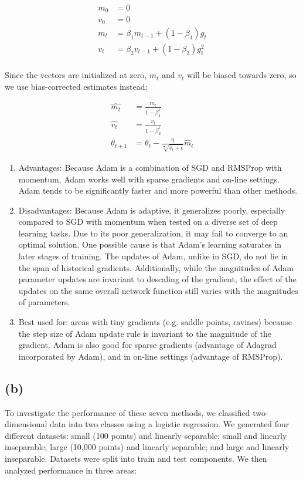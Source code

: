 \documentclass[twoside,11pt]{homework}
\begin{document}
\begin{align*}
	m_0 &= 0\\
	v_0 &= 0\\
	m_t &= \beta_1 m_{t-1}+(1-\beta_1)g_t\\
	v_t &= \beta_2 v_{t-1}+(1-\beta_2)g^2_t\\
\end{align*}

Since the vectors are initialized at zero, $m_t$ and $v_t$ will be biased towards zero, so we use bias-corrected estimates instead:

\begin{align*}
	\hat{m_t} &= \frac{m_t}{1-\beta^t_1}\\
	\hat{v_t} &= \frac{v_t}{1-\beta^t_2}\\
	\theta_{t+1} &= \theta_t - \frac{\eta}{\sqrt[•]{\hat{v}_t+\epsilon}}\hat{m}_t
\end{align*}

\begin{enumerate}
	\item Advantages: Because Adam is a combination of SGD and RMSProp with momentum, Adam works well with sparse gradients and on-line settings. Adam tends to be significantly faster and more powerful than other methods.
	\item Disadvantages: Because Adam is adaptive, it generalizes poorly, especially compared to SGD with momentum when tested on a diverse set of deep learning tasks. Due to its poor generalization, it may fail to converge to an optimal solution. One possible cause is that Adam's learning saturates in later stages of training. The updates of Adam, unlike in SGD, do not lie in the span of historical gradients. Additionally, while the magnitudes of Adam parameter updates are invariant to descaling of the gradient, the effect of the updates on the same overall network function still varies with the magnitudes of parameters.
	\item Best used for: areas with tiny gradients (e.g. saddle points, ravines) because the step size of Adam update rule is invariant to the magnitude of the gradient. Adam is also good for sparse gradients (advantage of Adagrad incorporated by Adam), and in on-line settings (advantage of RMSProp).
\end{enumerate}

\subsection{(b)}
To investigate the performance of these seven methods, we classified two-dimensional data into two classes using a logistic regression. We generated four different datasets: small (100 points) and linearly separable; small and linearly inseparable; large (10,000 points) and linearly separable; and large and linearly inseparable. Datasets were split into train and test components. We then analyzed performance in three areas:
\end{document}
